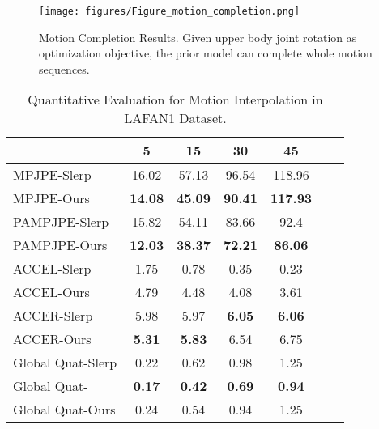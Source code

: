 \begin{figure*}[h]
\begin{center}
\vspace{-5mm}
\texttt{[image: figures/Figure\_motion\_completion.png]}
\end{center}
\vspace{-6mm}
\caption{Motion Completion Results. Given upper body joint rotation as optimization objective, the prior model can complete whole motion sequences.}
\label{motion_completion}
\vspace{-6mm}
\end{figure*}




\begin{table}[t!]
\small
\begin{center}
\footnotesize{
\setlength{\tabcolsep}{10pt}
\begin{tabular}{@{}l||cccccc@{}} 
\hline
 & 5  & 15 & 30 & 45 \\ \hline\hline
MPJPE-Slerp & 16.02 & 57.13 & 96.54 & 118.96 \\ \hline
MPJPE-Ours & \textbf{14.08} & \textbf{45.09} & \textbf{90.41} & \textbf{117.93} \\ \hline \hline
PAMPJPE-Slerp & 15.82 & 54.11 & 83.66 & 92.4 \\ \hline
PAMPJPE-Ours & \textbf{12.03} & \textbf{38.37} & \textbf{72.21} & \textbf{86.06} \\ \hline \hline
ACCEL-Slerp & 1.75 & 0.78 & 0.35 & 0.23 \\ \hline
ACCEL-Ours & 4.79 & 4.48 & 4.08 & 3.61 \\ \hline \hline
ACCER-Slerp & 5.98 & 5.97 & \textbf{6.05} & \textbf{6.06} \\ \hline
ACCER-Ours & \textbf{5.31} & \textbf{5.83} & 6.54 & 6.75 \\ \hline \hline
Global Quat-Slerp & 0.22 & 0.62 & 0.98 & 1.25 \\ \hline
Global Quat-\cite{harvey2020robust} & \textbf{0.17}  & \textbf{0.42} & \textbf{0.69} & \textbf{0.94} \\ \hline
Global Quat-Ours & 0.24 & 0.54 & 0.94 & 1.25 \\ \hline
\end{tabular}
}
\end{center}
\vspace{-5mm}
\caption{\small Quantitative Evaluation for Motion Interpolation in LAFAN1 Dataset.}
\label{table:lafan_interpolation}
\vspace{-6mm}
\end{table}

